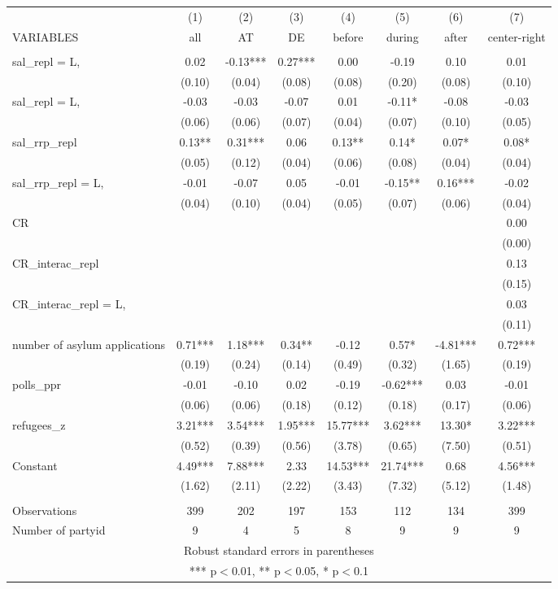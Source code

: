 \documentclass[]{article}
\begin{document}
\begin{tabular}{lccccccc} \hline
 & (1) & (2) & (3) & (4) & (5) & (6) & (7) \\
VARIABLES & all & AT & DE & before & during & after & center-right \\ \hline
 &  &  &  &  &  &  &  \\
sal\_repl = L, & 0.02 & -0.13*** & 0.27*** & 0.00 & -0.19 & 0.10 & 0.01 \\
 & (0.10) & (0.04) & (0.08) & (0.08) & (0.20) & (0.08) & (0.10) \\
sal\_repl = L, & -0.03 & -0.03 & -0.07 & 0.01 & -0.11* & -0.08 & -0.03 \\
 & (0.06) & (0.06) & (0.07) & (0.04) & (0.07) & (0.10) & (0.05) \\
sal\_rrp\_repl & 0.13** & 0.31*** & 0.06 & 0.13** & 0.14* & 0.07* & 0.08* \\
 & (0.05) & (0.12) & (0.04) & (0.06) & (0.08) & (0.04) & (0.04) \\
sal\_rrp\_repl = L, & -0.01 & -0.07 & 0.05 & -0.01 & -0.15** & 0.16*** & -0.02 \\
 & (0.04) & (0.10) & (0.04) & (0.05) & (0.07) & (0.06) & (0.04) \\
CR &  &  &  &  &  &  & 0.00 \\
 &  &  &  &  &  &  & (0.00) \\
CR\_interac\_repl &  &  &  &  &  &  & 0.13 \\
 &  &  &  &  &  &  & (0.15) \\
CR\_interac\_repl = L, &  &  &  &  &  &  & 0.03 \\
 &  &  &  &  &  &  & (0.11) \\
number of asylum applications & 0.71*** & 1.18*** & 0.34** & -0.12 & 0.57* & -4.81*** & 0.72*** \\
 & (0.19) & (0.24) & (0.14) & (0.49) & (0.32) & (1.65) & (0.19) \\
polls\_ppr & -0.01 & -0.10 & 0.02 & -0.19 & -0.62*** & 0.03 & -0.01 \\
 & (0.06) & (0.06) & (0.18) & (0.12) & (0.18) & (0.17) & (0.06) \\
refugees\_z & 3.21*** & 3.54*** & 1.95*** & 15.77*** & 3.62*** & 13.30* & 3.22*** \\
 & (0.52) & (0.39) & (0.56) & (3.78) & (0.65) & (7.50) & (0.51) \\
Constant & 4.49*** & 7.88*** & 2.33 & 14.53*** & 21.74*** & 0.68 & 4.56*** \\
 & (1.62) & (2.11) & (2.22) & (3.43) & (7.32) & (5.12) & (1.48) \\
 &  &  &  &  &  &  &  \\
Observations & 399 & 202 & 197 & 153 & 112 & 134 & 399 \\
 Number of partyid & 9 & 4 & 5 & 8 & 9 & 9 & 9 \\ \hline
\multicolumn{8}{c}{ Robust standard errors in parentheses} \\
\multicolumn{8}{c}{ *** p$<$0.01, ** p$<$0.05, * p$<$0.1} \\
\end{tabular}
\end{document}

